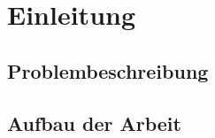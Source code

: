 %
%
%

\chapter{Einleitung}\label{chp:Einleitung}

\section{Problembeschreibung}\label{sct:Problembeschreibung}

\section{Aufbau der Arbeit}\label{sct:Aufbau der Arbeit}

%
%
%
